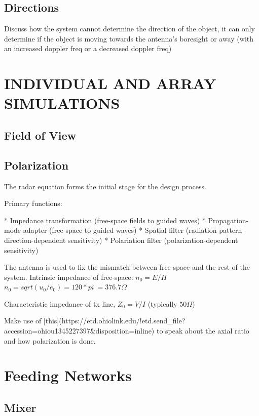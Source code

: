 \documentclass[11pt]{witseiepaper}
\begin{document}
\subsection{Directions} \label{sec:Directions}

Discuss how the system cannot determine the direction of the object, it can only determine if the object is moving towards the antenna's boresight or away (with an increased doppler freq or a decreased doppler freq)

\section{INDIVIDUAL AND ARRAY SIMULATIONS} \label{sec:INDIVIDUALANDARRAYSIMULATIONS}

\subsection{Field of View} \label{sec:FieldOfView}

\subsection{Polarization} \label{sec:Polarization}
The radar equation forms the initial stage for the design process.

Primary functions:

    * Impedance transformation (free-space fields to guided waves)
    * Propagation-mode adapter (free-space to guided waves)
    * Spatial filter (radiation pattern - direction-dependent sensitivity)
    * Polariation filter (polarization-dependent sensitivity)

The antenna is used to fix the mismatch between free-space and the rest of the system.
Intrinsic impedance of free-space: $n_0 = E/H$
$n_0 = sqrt(u_0 / e_0) = 120 * pi ~= 376.7 \Omega$

Characteristic impedance of tx line, $Z_0 = V/I$ (typically $50 \Omega$)



Make use of [this](https://etd.ohiolink.edu/!etd.send\_file?accession=ohiou1345227397\&disposition=inline) to speak about the axial ratio and how polarization is done.


\section{Feeding Networks} \label{sec:FeedingNetworks}


\subsection{Mixer} \label{sec:Mixer}
\end{document}
